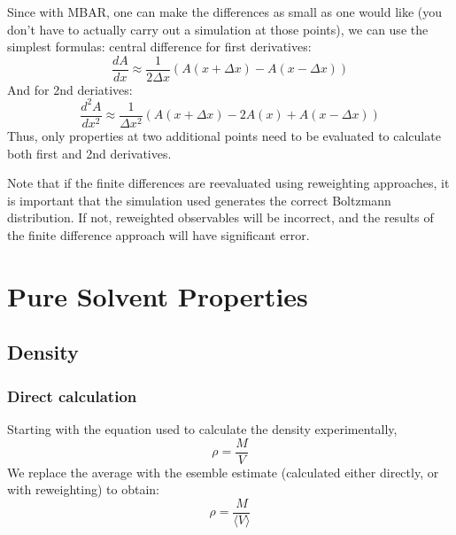 \documentclass[a4paper,12pt]{article}
\begin{document}
Since with MBAR, one can make the differences as small as one would
like (you don't have to actually carry out a simulation at those
points), we can use the simplest formulas: central difference for first derivatives: 
\[\frac{dA}{dx} \approx \frac{1}{2\Delta x}\left( A(x+\Delta x) - A(x-\Delta x)\right)\]
And for 2nd deriatives:
\[\frac{d^2A}{dx^2} \approx \frac{1}{\Delta x^2}\left( A(x+\Delta x) - 2A(x) + A(x-\Delta x)\right)\]
Thus, only properties at two additional points need to be evaluated to
calculate both first and 2nd derivatives.

Note that if the finite differences are reevaluated using reweighting
approaches, it is important that the simulation used generates the
correct Boltzmann distribution. If not, reweighted observables will be
incorrect, and the results of the finite difference approach will have
significant error.


\section{Pure Solvent Properties}
\subsection{Density}
\subsubsection{Direct calculation}
 Starting with the equation used to calculate the density experimentally, 
\begin{equation} \rho = \frac{M}{V} \end{equation}
We replace the average with the esemble estimate (calculated either directly, or with reweighting) to obtain: 
\begin{equation} \rho = \frac{M}{\langle V \rangle} \end{equation}
\end{document}
